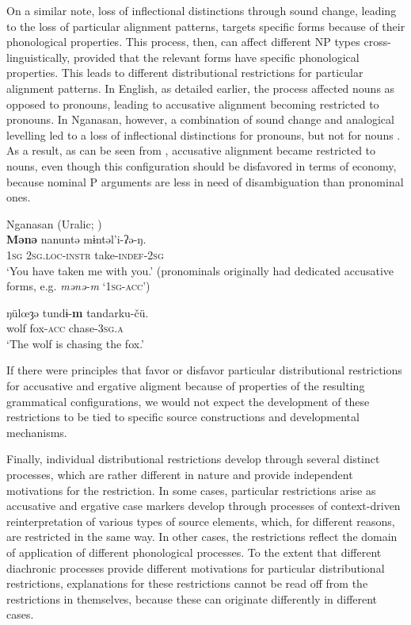 \documentclass[output=paper]{langsci/langscibook}
\begin{document}
\z

On a similar note, loss of inflectional distinctions through sound
change,
leading to the loss of particular alignment patterns, targets specific
forms because of their phonological properties. This process, then, can affect different NP types cross-linguistically,
provided that the relevant forms have specific phonological
properties. This leads to different distributional
restrictions for particular alignment patterns. In English, as
detailed earlier, the process affected nouns as
opposed to pronouns, leading to accusative alignment becoming
restricted to pronouns. In  Nganasan, however, a combination of sound change and
analogical levelling led to a  loss of inflectional
distinctions for pronouns, but not for nouns
. As a result, as can be seen from
, accusative alignment became
restricted to nouns, even though this configuration should be
disfavored in terms of economy, because nominal P arguments are less in need
of disambiguation than pronominal ones.

\ea\label{nganasan}
Nganasan (Uralic; )\\
  \ea
    \gll \textbf{{Mənə}} nanuntə m​ɨntəl'i-ʔə-ŋ.\\
    1\textsc{sg} 2\textsc{sg.loc-instr} take-\textsc{indef}-2\textsc{sg}\\
    \glt `You have taken me with you.' (pronominals originally had dedicated accusative forms, e.g. {\em mənə-m} `1\textsc{sg-acc}')
    
  \ex
    \gll ŋül{\oe}ȝə tund​ɨ-\textbf{{m}} tandarku-čü.\\
    wolf fox-\textsc{acc} chase-3\textsc{sg.a}\\
    \glt `The wolf is chasing the fox.'
    
  \z
\z

If there were principles that favor or disfavor particular distributional
restrictions for accusative and ergative aligment because of properties of the
resulting grammatical configurations, we would not expect the development of
these restrictions to be tied to specific source
constructions and developmental mechanisms. 

Finally, individual distributional restrictions develop through several distinct
processes, which are rather different in nature and provide
independent motivations for the restriction. In some cases, particular
restrictions arise as accusative and ergative case markers develop
through processes of context-driven reinterpretation of various types
of source elements, which, for different reasons, are restricted in the same way. In other cases, the restrictions reflect the domain of
application of different phonological processes. To the extent that different diachronic processes provide different
motivations for particular distributional restrictions, 
explanations for these restrictions cannot be read off from the
restrictions in themselves, because these can originate differently in
different cases.
\end{document}
